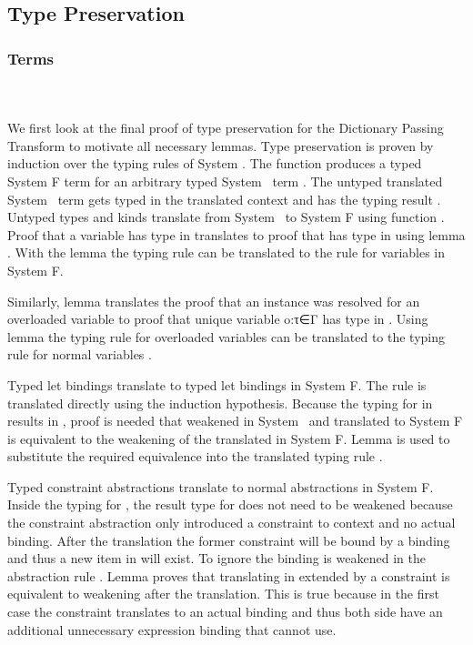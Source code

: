 \subsection{Type Preservation}
\subsubsection{Terms}\hfill\\\\
We first look at the final proof of type preservation for the Dictionary Passing Transform to motivate all necessary lemmas. 
Type preservation is proven by induction over the typing rules of System \Fo. 
The function  produces a typed System F term for an arbitrary typed System \Fo\ term . 
The untyped translated System \Fo\ term   gets typed in the translated context   and has the typing result  . 
Untyped types and kinds translate from System \Fo\ to System F using function .
\DPTTermPres
Proof  that a variable  has type  in  translates to proof that   has type   in   using lemma . 
With the lemma  the typing rule  can be translated to the rule for variables in System F. 

\noindent Similarly, lemma  translates the proof that an instance  \Constr{:}  was resolved for an overloaded variable  to proof that unique variable  {o:τ∈Γ} has type   in  .  
Using lemma  the typing rule for overloaded variables  can be translated to the typing rule for normal variables .

\noindent Typed let bindings    translate to typed let bindings in System F. 
The rule  is translated directly using the induction hypothesis. 
Because the typing for  in  results in  , proof is needed that  weakened in System \Fo\ and translated to System F is equivalent to the weakening of the translated  in System F. 
Lemma  is used to substitute the required equivalence into the translated typing rule  .

\noindent Typed constraint abstractions  translate to normal abstractions in System F.
Inside the typing for , the result type  for  does not need to be weakened because the constraint abstraction only introduced a constraint to context  and no actual binding. 
After the translation the former constraint will be bound by a binding and thus a new item in   will exist. To ignore the binding  is weakened in the abstraction rule .
Lemma  proves that translating  in  extended by a constraint is equivalent to weakening  after the translation. 
This is true because in the first case the constraint translates to an actual binding and thus both side have an additional unnecessary expression binding that  cannot use.

